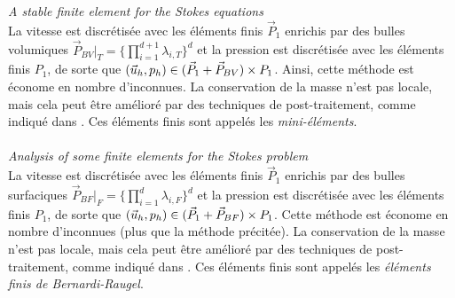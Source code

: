 {\em A stable finite element for the Stokes equations} \cite{ArBF84}
\\
La vitesse est discr\'etis\'ee avec les \'el\'ements finis $\vec{P}_1$ enrichis par des bulles volumiques $\vec{P}_{BV}{}|_T=\{\prod_{i=1}^{d+1}\lambda_{i,T}\}^d$ et la pression est discr\'etis\'ee avec les \'el\'ements finis $P_1$, de sorte que $(\velocity_h,p_h)\in(\vec{P}_1+\vec{P}_{BV})\times P_1$. Ainsi, cette m\'ethode est \'econome en nombre d'inconnues. La conservation de la masse n'est pas locale, mais cela peut \^etre am\'elior\'e par des techniques de post-traitement, comme indiqu\'e dans \cite{JKMN17}. Ces \'el\'ements finis sont appel\'es les {\em mini-\'el\'ements}.\\
\\
{\em Analysis of some finite elements for the Stokes problem} \cite{BeRa85}
\\
La vitesse est discr\'etis\'ee avec les \'el\'ements finis $\vec{P}_1$ enrichis par des bulles surfaciques $\vec{P}_{BF}{}|_F=\{\prod_{i=1}^d\lambda_{i,F}\}^d$ et la pression est discr\'etis\'ee avec les \'el\'ements finis $P_1$, de sorte que $(\velocity_h,p_h)\in(\vec{P}_1+\vec{P}_{BF})\times P_1$. Cette m\'ethode est \'econome en nombre d'inconnues (plus que la m\'ethode pr\'ecit\'ee). La conservation de la masse n'est pas locale, mais cela peut \^etre am\'elior\'e par des techniques de post-traitement, comme indiqu\'e dans \cite{JKMN17}. Ces \'el\'ements finis sont appel\'es les {\em \'el\'ements finis de Bernardi-Raugel}. 
